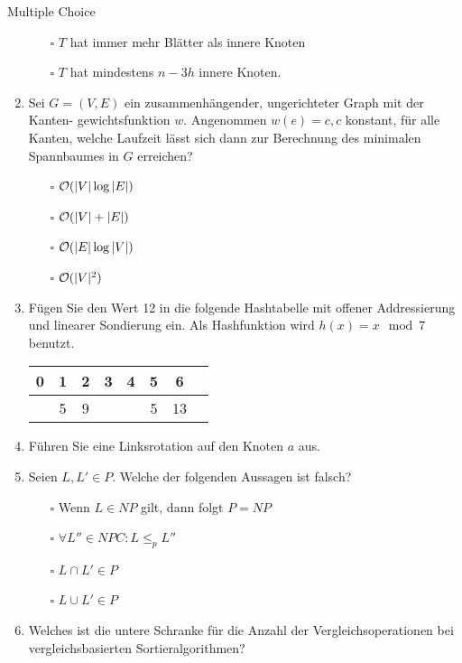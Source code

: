 \documentclass{article}
\begin{document}
\begin{exercise}{Multiple Choice}
\begin{enumerate}
\begin{itemize}
            \item[$\square$] $T$ hat immer mehr Blätter als innere Knoten
            \item[$\square$] $T$ hat mindestens $n - 3h$ innere Knoten.
          \end{itemize}
    \item Sei $G = (V,E)$ ein zusammenhängender, ungerichteter Graph mit der Kanten- gewichtsfunktion $w$. Angenommen $w(e) = c, c$ konstant, für alle Kanten, welche Laufzeit lässt sich dann zur Berechnung des minimalen Spannbaumes in $G$ erreichen?
          \begin{itemize}
            \item[$\square$] $\mathcal{O}(|V| \log |E|)$
            \item[$\square$] $\mathcal{O}(|V| + |E|)$
            \item[$\square$] $\mathcal{O}(|E| \log |V|)$
            \item[$\square$] $\mathcal{O}(|V|^2)$
          \end{itemize}
    \item Fügen Sie den Wert 12 in die folgende Hashtabelle mit offener Addressierung und linearer Sondierung ein. Als Hashfunktion wird $h(x) = x \mod 7$ benutzt.
          \begin{center}
            \begin{tabular}{|c|c|c|c|c|c|c|c|}
              \hline
              0 & 1 & 2 & 3 & 4 & 5 & 6  \\
              \hline
              \hline
                & 5 & 9 &   &   & 5 & 13 \\
              \hline
            \end{tabular}
          \end{center}
    \item Führen Sie eine Linksrotation auf den Knoten $a$ aus.
    \item Seien $L, L' \in P$. Welche der folgenden Aussagen ist falsch?
          \begin{itemize}
            \item[$\square$] Wenn $L \in NP$ gilt, dann folgt $P = NP$
            \item[$\square$] $\forall L'' \in NPC:L \leq_p L''$
            \item[$\square$] $L \cap L' \in P$
            \item[$\square$] $L \cup L' \in P$
          \end{itemize}
    \item Welches ist die untere Schranke für die Anzahl der Vergleichsoperationen bei vergleichsbasierten Sortieralgorithmen?

\end{enumerate}
\end{exercise}
\end{document}
